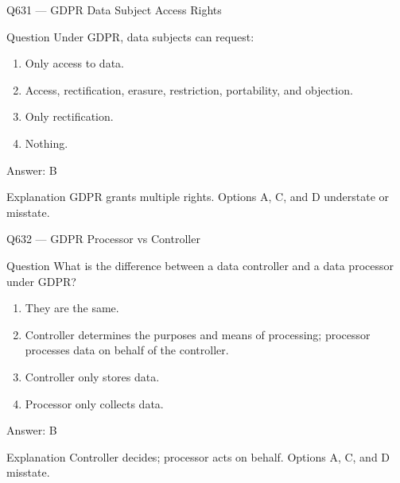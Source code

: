 \documentclass[aspectratio=169,8pt]{beamer}
\begin{document}
	\begin{frame}{Q631 --- GDPR Data Subject Access Rights}
		\begin{block}{Question}
			Under GDPR, data subjects can request:
			\begin{enumerate}
				\item Only access to data.
				\item Access, rectification, erasure, restriction, portability, and objection.
				\item Only rectification.
				\item Nothing.
			\end{enumerate}
		\end{block}
		\begin{exampleblock}{Answer: B}\end{exampleblock}
		\begin{block}{Explanation}
			GDPR grants multiple rights. Options A, C, and D understate or misstate.
		\end{block}
	\end{frame}
	
	\begin{frame}{Q632 --- GDPR Processor vs Controller}
		\begin{block}{Question}
			What is the difference between a data controller and a data processor under GDPR?
			\begin{enumerate}
				\item They are the same.
				\item Controller determines the purposes and means of processing; processor processes data on behalf of the controller.
				\item Controller only stores data.
				\item Processor only collects data.
			\end{enumerate}
		\end{block}
		\begin{exampleblock}{Answer: B}\end{exampleblock}
		\begin{block}{Explanation}
			Controller decides; processor acts on behalf. Options A, C, and D misstate.
		\end{block}
	\end{frame}
	
\end{document}

